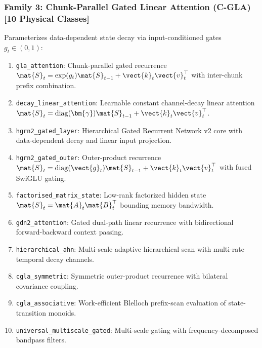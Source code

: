 \subsubsection{Family 3: Chunk-Parallel Gated Linear Attention (C-GLA) [10 Physical Classes]}
Parameterizes data-dependent state decay via input-conditioned gates $g_t \in (0, 1)$:
\begin{enumerate}
    \item \texttt{gla\_attention}: Chunk-parallel gated recurrence $\mat{S}_t = \exp(g_t) \mat{S}_{t-1} + \vect{k}_t \vect{v}_t^\top$ with inter-chunk prefix combination.
    \item \texttt{decay\_linear\_attention}: Learnable constant channel-decay linear attention $\mat{S}_t = \operatorname{diag}(\bm{\gamma}) \mat{S}_{t-1} + \vect{k}_t \vect{v}_t^\top$.
    \item \texttt{hgrn2\_gated\_layer}: Hierarchical Gated Recurrent Network v2 core with data-dependent decay and linear input projection.
    \item \texttt{hgrn2\_gated\_outer}: Outer-product recurrence $\mat{S}_t = \operatorname{diag}(\vect{g}_t) \mat{S}_{t-1} + \vect{k}_t \vect{v}_t^\top$ with fused SwiGLU gating.
    \item \texttt{factorised\_matrix\_state}: Low-rank factorized hidden state $\mat{S}_t = \mat{A}_t \mat{B}_t^\top$ bounding memory bandwidth.
    \item \texttt{gdn2\_attention}: Gated dual-path linear recurrence with bidirectional forward-backward context passing.
    \item \texttt{hierarchical\_ahn}: Multi-scale adaptive hierarchical scan with multi-rate temporal decay channels.
    \item \texttt{cgla\_symmetric}: Symmetric outer-product recurrence with bilateral covariance coupling.
    \item \texttt{cgla\_associative}: Work-efficient Blelloch prefix-scan evaluation of state-transition monoids.
    \item \texttt{universal\_multiscale\_gated}: Multi-scale gating with frequency-decomposed bandpass filters.
\end{enumerate}

